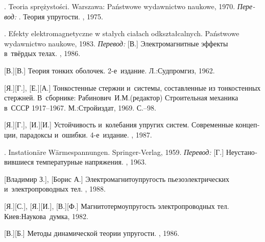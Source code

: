 \begin{thebibliography}{123}
\begin{otherlanguage}{russian}
.
Teoria sprężystości.
Warszawa: Państwowe wy\-daw\-nic\-two naukowe, 1970.
\emph{Перевод:}
.
Теория упругости.
\mirpublisher, 1975.

. Efekty elektromagnetyczne w stałych ciałach od\-kształ\-cal\-nych. Państwowe wydawnictwo naukowe, 1983. 
\emph{Перевод:}
[В.] Электромагнитные эффекты в~твёрдых телах. \mirpublisher, 1986. 

[В.][В.] Теория тонких оболочек. 2\hbox{-}е~издание. Л.:\;Судпромгиз, 1962. 

[Я.][Г.], [Е.][А.] Тонкостенные стержни и~системы, составленные из тонкостенных стержней. В~сборнике: Рабинович~И.\:М.\:(редактор) Строительная механика в~СССР 1917\hbox{--}1967. М.:\;Строй\-издат, 1969. С.\hbox{--}98.

[Я.][Г.], [И.][И.] Устойчивость и~колебания упругих систем. Современные концепции, парадоксы и~ошибки. 4\hbox{-}е~издание. \naukapublisher, 1987. 

. Instation\"{a}re W\"{a}rmespannungen. Springer\hbox{-}Verlag, 1959. 
\emph{Перевод:} [Г.] Неустановившиеся температурные напряжения. \fizmatgiz, 1963. 

[Владимир З.], [Борис А.] Электромагнитоупругость пьезоэлектрических и~электропроводных тел. \naukapublisher, 1988. 

[Я.][С.], [Я.][И.], [В.][Ф.]
Магнито\-термо\-упру\-гость электропроводных тел.
Киев:\;Наукова~думка, 1982.

[В.][Б.] Методы динамической теории упругости. \naukapublisher, 1986.


\end{otherlanguage}
\end{thebibliography}
